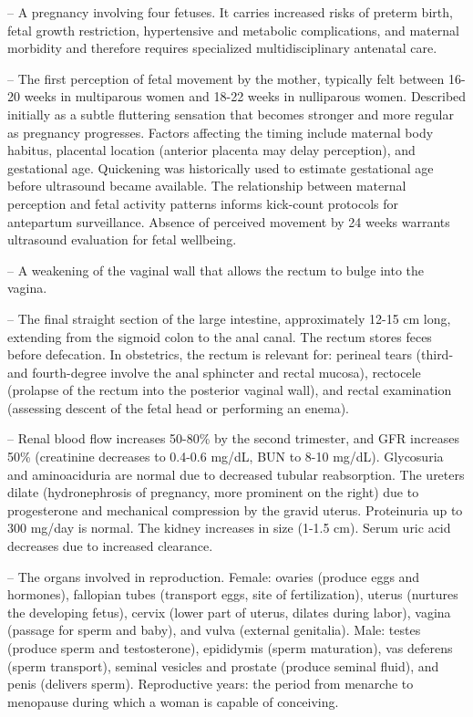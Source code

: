 -- A pregnancy involving four fetuses. It carries increased risks of preterm birth, fetal growth restriction, hypertensive and metabolic complications, and maternal morbidity and therefore requires specialized multidisciplinary antenatal care.

-- The first perception of fetal movement by the mother, typically felt between 16-20 weeks in multiparous women and 18-22 weeks in nulliparous women. Described initially as a subtle fluttering sensation that becomes stronger and more regular as pregnancy progresses. Factors affecting the timing include maternal body habitus, placental location (anterior placenta may delay perception), and gestational age. Quickening was historically used to estimate gestational age before ultrasound became available. The relationship between maternal perception and fetal activity patterns informs kick-count protocols for antepartum surveillance. Absence of perceived movement by 24 weeks warrants ultrasound evaluation for fetal wellbeing.

-- A weakening of the vaginal wall that allows the rectum to bulge into the vagina.

-- The final straight section of the large intestine, approximately 12-15 cm long, extending from the sigmoid colon to the anal canal. The rectum stores feces before defecation. In obstetrics, the rectum is relevant for: perineal tears (third- and fourth-degree involve the anal sphincter and rectal mucosa), rectocele (prolapse of the rectum into the posterior vaginal wall), and rectal examination (assessing descent of the fetal head or performing an enema).

-- Renal blood flow increases 50-80\% by the second trimester, and GFR increases 50\% (creatinine decreases to 0.4-0.6 mg/dL, BUN to 8-10 mg/dL). Glycosuria and aminoaciduria are normal due to decreased tubular reabsorption. The ureters dilate (hydronephrosis of pregnancy, more prominent on the right) due to progesterone and mechanical compression by the gravid uterus. Proteinuria up to 300 mg/day is normal. The kidney increases in size (1-1.5 cm). Serum uric acid decreases due to increased clearance.

-- The organs involved in reproduction. Female: ovaries (produce eggs and hormones), fallopian tubes (transport eggs, site of fertilization), uterus (nurtures the developing fetus), cervix (lower part of uterus, dilates during labor), vagina (passage for sperm and baby), and vulva (external genitalia). Male: testes (produce sperm and testosterone), epididymis (sperm maturation), vas deferens (sperm transport), seminal vesicles and prostate (produce seminal fluid), and penis (delivers sperm). Reproductive years: the period from menarche to menopause during which a woman is capable of conceiving.

